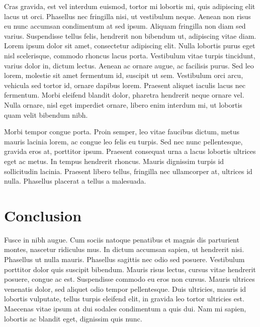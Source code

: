\documentclass[a4paper, 11pt]{article} %
\begin{document}
Cras gravida, est vel interdum euismod, tortor mi lobortis mi, quis adipiscing elit lacus ut orci. Phasellus nec fringilla nisi, ut vestibulum neque. Aenean non risus eu nunc accumsan condimentum at sed ipsum.
Aliquam fringilla non diam sed varius. Suspendisse tellus felis, hendrerit non bibendum ut, adipiscing vitae diam. Lorem ipsum dolor sit amet, consectetur adipiscing elit. Nulla lobortis purus eget nisl scelerisque, commodo rhoncus lacus porta. Vestibulum vitae turpis tincidunt, varius dolor in, dictum lectus. Aenean ac ornare augue, ac facilisis purus. Sed leo lorem, molestie sit amet fermentum id, suscipit ut sem. Vestibulum orci arcu, vehicula sed tortor id, ornare dapibus lorem. Praesent aliquet iaculis lacus nec fermentum. Morbi eleifend blandit dolor, pharetra hendrerit neque ornare vel. Nulla ornare, nisl eget imperdiet ornare, libero enim interdum mi, ut lobortis quam velit bibendum nibh.

Morbi tempor congue porta. Proin semper, leo vitae faucibus dictum, metus mauris lacinia lorem, ac congue leo felis eu turpis. Sed nec nunc pellentesque, gravida eros at, porttitor ipsum. Praesent consequat urna a lacus lobortis ultrices eget ac metus. In tempus hendrerit rhoncus. Mauris dignissim turpis id sollicitudin lacinia. Praesent libero tellus, fringilla nec ullamcorper at, ultrices id nulla. Phasellus placerat a tellus a malesuada.


\section*{Conclusion}

Fusce in nibh augue. Cum sociis natoque penatibus et magnis dis parturient montes, nascetur ridiculus mus. In dictum accumsan sapien, ut hendrerit nisi. Phasellus ut nulla mauris. Phasellus sagittis nec odio sed posuere. Vestibulum porttitor dolor quis suscipit bibendum. Mauris risus lectus, cursus vitae hendrerit posuere, congue ac est. Suspendisse commodo eu eros non cursus. Mauris ultrices venenatis dolor, sed aliquet odio tempor pellentesque. Duis ultricies, mauris id lobortis vulputate, tellus turpis eleifend elit, in gravida leo tortor ultricies est. Maecenas vitae ipsum at dui sodales condimentum a quis dui. Nam mi sapien, lobortis ac blandit eget, dignissim quis nunc.
\end{document}
